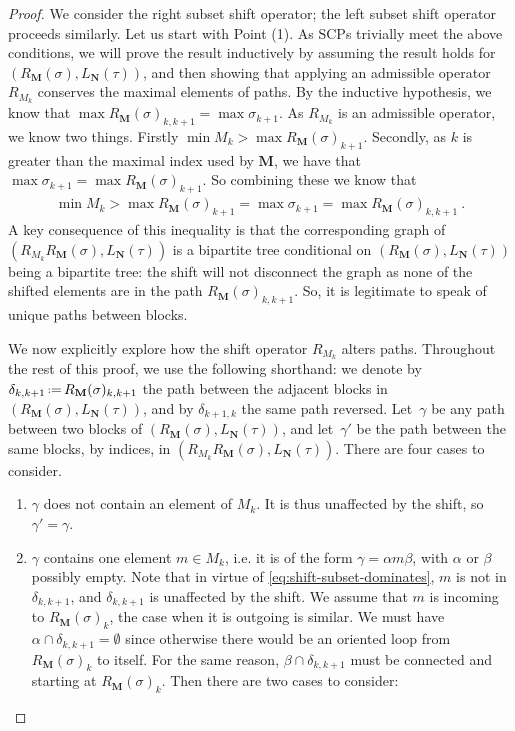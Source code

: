 \documentclass{amsart}
\theoremstyle{definition}
\newcommand{\eqdef}{\mbox{\,\raisebox{0.2ex}{\scriptsize\ensuremath{\mathrm:}}\ensuremath{=}\,}} %
\newcommand{\SCP}{\mathrm{SCP}}
\begin{document}
\begin{proof}
We consider the right subset shift operator; the left subset shift operator proceeds similarly.
Let us start with Point (1).
As $\SCP$s trivially meet the above conditions, we will prove the result inductively by assuming the result holds for $(R_{\mathbf{M}}(\sigma),L_{\mathbf{N}}(\tau))$, and then showing that applying an admissible operator $R_{M_k}$ conserves the maximal elements of paths.
By the inductive hypothesis, we know that $\max R_{\mathbf{M}}(\sigma)_{k,k+1}= \max \sigma_{k+1}$.
As $R_{M_k}$ is an admissible operator, we know two things.
Firstly $\min M_k > \max R_{\mathbf{M}}(\sigma)_{k+1}$.
Secondly, as $k$ is greater than the maximal index used by $\mathbf{M}$, we have that $\max \sigma_{k+1} = \max R_{\mathbf{M}}(\sigma)_{k+1}$.
So combining these we know that
\begin{align}
    \label{eq:shift-subset-dominates}
    \min M_k > \max R_{\mathbf{M}}(\sigma)_{k+1} = \max \sigma_{k+1} = \max R_{\mathbf{M}}(\sigma)_{k,k+1} \ . 
\end{align}
A key consequence of this inequality is that the corresponding graph of $(R_{M_k}R_{\mathbf{M}}(\sigma),L_{\mathbf{N}}(\tau))$ is a bipartite tree conditional on $(R_{\mathbf{M}}(\sigma),L_{\mathbf{N}}(\tau))$ being a bipartite tree: the shift will not disconnect the graph as none of the shifted elements are in the path $R_{\mathbf{M}}(\sigma)_{k,k+1}$. 
So, it is legitimate to speak of unique paths between blocks. 

We now explicitly explore how the shift operator $R_{M_k}$ alters paths. 
Throughout the rest of this proof, we use the following shorthand: we denote by $\delta_{k,k+1} \eqdef  R_{\mathbf{M}}(\sigma)_{k,k+1}$ the path between the adjacent blocks in $(R_{\mathbf{M}}(\sigma),L_{\mathbf{N}}(\tau))$, and by $\delta_{k+1,k}$ the same path reversed.
Let~$\gamma$ be any path between two blocks of $(R_{\mathbf{M}}(\sigma),L_{\mathbf{N}}(\tau))$, and let~$\gamma'$ be the path between the same blocks, by indices, in $(R_{M_k}R_{\mathbf{M}}(\sigma),L_{\mathbf{N}}(\tau))$. 
There are four cases to consider. 
\begin{enumerate}

    \item $\gamma$ does not contain an element of $M_k$.
    It is thus unaffected by the shift, so $\gamma' = \gamma$.

    \item $\gamma$ contains one element $m\in M_k$, i.e. it is of the form $\gamma = \alpha m \beta$, with $\alpha$ or $\beta$ possibly empty.
    Note that in virtue of \cref{eq:shift-subset-dominates}, $m$ is not in $\delta_{k,k+1}$, and $\delta_{k,k+1}$ is unaffected by the shift. 
    We assume that $m$ is incoming to $R_\mathbf{M}(\sigma)_{k}$, the case when it is outgoing is similar.
    We must have $\alpha \cap \delta_{k,k+1}=\emptyset$ since otherwise there would be an oriented loop from $R_\mathbf{M}(\sigma)_{k}$ to itself.
    For the same reason, $\beta \cap \delta_{k,k+1}$ must be connected and starting at $R_\mathbf{M}(\sigma)_{k}$.
    Then there are two cases to consider:
    \begin{enumerate}


\end{enumerate}
\end{enumerate}
\end{proof}
\end{document}
